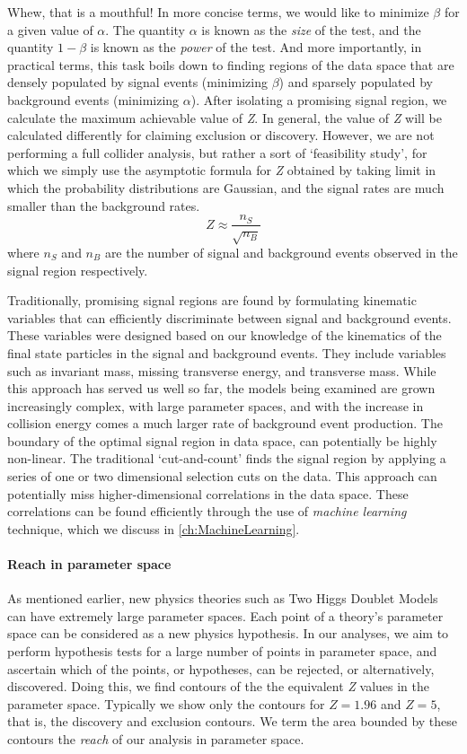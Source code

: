Whew, that is a mouthful! In more concise terms, we would like to minimize $\beta$ for a given value of $\alpha$. The quantity $\alpha$ is known as the \emph{size} of the test, and the quantity $1-\beta$ is known as the \emph{power} of the test. And more importantly, in practical terms, this task boils down to finding regions of the data space that are densely populated by signal events (minimizing $\beta$) and sparsely populated by background events (minimizing $\alpha$). After isolating a promising signal region, we calculate the maximum achievable value of \emph{Z}. In general, the value of \emph{Z} will be calculated differently for claiming exclusion or discovery. However, we are not performing a full collider analysis, but rather a sort of `feasibility study', for which we simply use the asymptotic formula for \emph{Z} obtained by taking limit in which the probability distributions are Gaussian, and the signal rates are much smaller than the background rates.
\[Z \approx \frac{n_S}{\sqrt{n_B}}\]
where $n_S$ and $n_B$ are the number of signal and background events observed in the signal region respectively.

Traditionally, promising signal regions are found by formulating kinematic variables that can efficiently discriminate between signal and background events. These variables were designed based on our knowledge of the kinematics of the final state particles in the signal and background events. They include variables such as invariant mass, missing transverse energy, and transverse mass. While this approach has served us well so far, the models being examined are grown increasingly complex, with large parameter spaces, and with the increase in collision energy comes a much larger rate of background event production. The boundary of the optimal signal region in data space, can potentially be highly non-linear. The traditional `cut-and-count' finds the signal region by applying a series of one or two dimensional selection cuts on the data. This approach can potentially miss higher-dimensional correlations in the data space. These correlations can be found efficiently through the use of \emph{machine learning} technique, which we discuss in \autoref{ch:MachineLearning}.

\paragraph{Reach in parameter space} As mentioned earlier, new physics theories such as Two Higgs Doublet Models can have extremely large parameter spaces. Each point of a theory's parameter space can be considered as a new physics hypothesis. In our analyses, we aim to perform hypothesis tests for a large number of points in parameter space, and ascertain which of the points, or hypotheses, can be rejected, or alternatively, discovered. Doing this, we find contours of the the equivalent \emph{Z} values in the parameter space. Typically we show only the contours for $Z = 1.96$ and $Z=5$, that is, the discovery and exclusion contours. We term the area bounded by these contours the \emph{reach} of our analysis in parameter space. 
